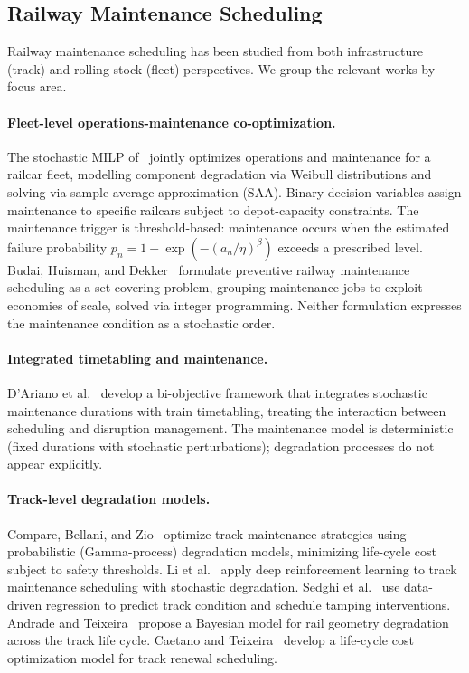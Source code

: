 \documentclass[11pt,a4paper]{article}
\theoremstyle{plain}
\theoremstyle{definition}
\theoremstyle{remark}
\begin{document}
\subsection{Railway Maintenance Scheduling}
\label{sec:related:s3}

Railway maintenance scheduling has been studied from both infrastructure (track) and rolling-stock (fleet) perspectives. We group the relevant works by focus area.

\paragraph{Fleet-level operations-maintenance co-optimization.}
The stochastic MILP of~\cite{railcarMILP2025} jointly optimizes operations and maintenance for a railcar fleet, modelling component degradation via Weibull distributions and solving via sample average approximation (SAA). Binary decision variables assign maintenance to specific railcars subject to depot-capacity constraints. The maintenance trigger is threshold-based: maintenance occurs when the estimated failure probability $p_n=1-\exp(-(a_n/\eta)^\beta)$ exceeds a prescribed level. Budai, Huisman, and Dekker~\cite{budai2006} formulate preventive railway maintenance scheduling as a set-covering problem, grouping maintenance jobs to exploit economies of scale, solved via integer programming. Neither formulation expresses the maintenance condition as a stochastic order.

\paragraph{Integrated timetabling and maintenance.}
D'Ariano et al.~\cite{dariano2017} develop a bi-objective framework that integrates stochastic maintenance durations with train timetabling, treating the interaction between scheduling and disruption management. The maintenance model is deterministic (fixed durations with stochastic perturbations); degradation processes do not appear explicitly.

\paragraph{Track-level degradation models.}
Compare, Bellani, and Zio~\cite{compare2020} optimize track maintenance strategies using probabilistic (Gamma-process) degradation models, minimizing life-cycle cost subject to safety thresholds. Li et al.~\cite{li2023track} apply deep reinforcement learning to track maintenance scheduling with stochastic degradation. Sedghi et al.~\cite{sedghi2022} use data-driven regression to predict track condition and schedule tamping interventions. Andrade and Teixeira~\cite{andradeGomes2015} propose a Bayesian model for rail geometry degradation across the track life cycle. Caetano and Teixeira~\cite{caetano2015} develop a life-cycle cost optimization model for track renewal scheduling.
\end{document}
